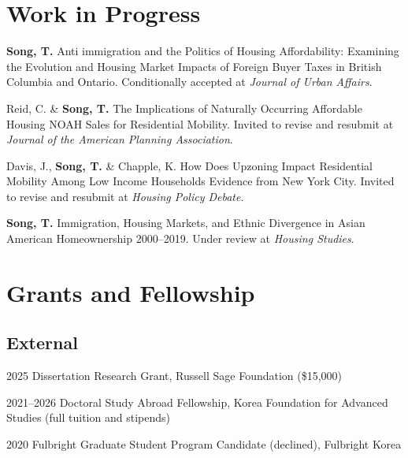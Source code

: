 \documentclass[11pt,letterpaper]{article}
\newcommand{\money}[1]{(\$#1)}
\newcommand{\term}[1]{(#1)}
\begin{document}
\section{Work in Progress}
\begin{subpoints}
  \item \textbf{Song, T.} Anti immigration and the Politics of Housing Affordability: Examining the Evolution and Housing Market Impacts of Foreign Buyer Taxes in British Columbia and Ontario. Conditionally accepted at \emph{Journal of Urban Affairs}.
  \item Reid, C. \& \textbf{Song, T.} The Implications of Naturally Occurring Affordable Housing NOAH Sales for Residential Mobility. Invited to revise and resubmit at \emph{Journal of the American Planning Association}.
  \item Davis, J., \textbf{Song, T.} \& Chapple, K. How Does Upzoning Impact Residential Mobility Among Low Income Households Evidence from New York City. Invited to revise and resubmit at \emph{Housing Policy Debate}.
  \item \textbf{Song, T.} Immigration, Housing Markets, and Ethnic Divergence in Asian American Homeownership 2000–2019. Under review at \emph{Housing Studies}.
\end{subpoints}

\section{Grants and Fellowship}

\subsection{External}
\begin{tablist}
  \item[2025] \tab{}Dissertation Research Grant, Russell Sage Foundation \money{15,000}
  \item[2021–2026] \tab{}Doctoral Study Abroad Fellowship, Korea Foundation for Advanced Studies \term{full tuition and stipends}
  \item[2020] \tab{}Fulbright Graduate Student Program Candidate \term{declined}, Fulbright Korea
\end{tablist}
\end{document}
